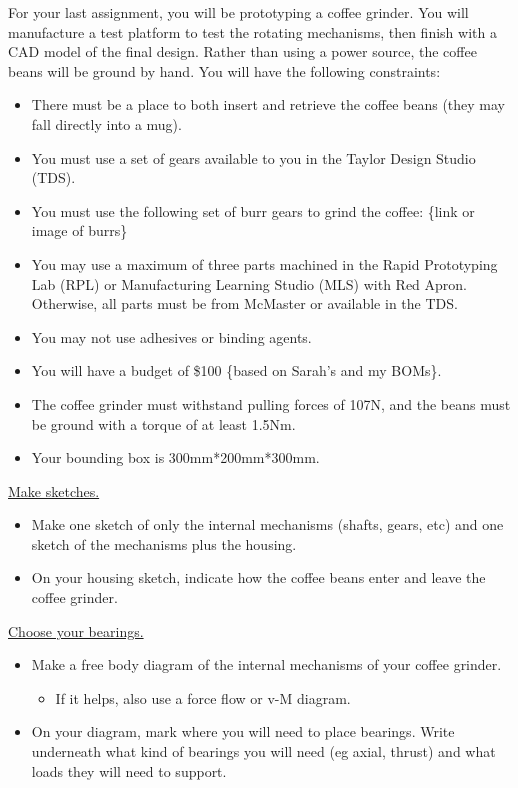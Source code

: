 \documentclass[11pt,letterpaper]{article}
\begin{document}
\MakeHandoutHeader

For your last assignment, you will be prototyping a coffee grinder. You will manufacture a
test platform to test the rotating mechanisms, then finish with a CAD model of the final design.
Rather than using a power source, the coffee beans will be ground by hand. You will have the
following constraints:
\begin{itemize}
  \item There must be a place to both insert and retrieve the coffee beans (they may fall directly into
    a mug).
  \item You must use a set of gears available to you in the Taylor Design Studio (TDS).
  \item You must use the following set of burr gears to grind the coffee: \{link or image of burrs\}
  \item You may use a maximum of three parts machined in the Rapid Prototyping Lab (RPL) or
    Manufacturing Learning Studio (MLS) with Red Apron. Otherwise, all parts must be from
    McMaster or available in the TDS.
  \item You may not use adhesives or binding agents.
  \item You will have a budget of \$100 \{based on Sarah's and my BOMs\}.
  \item The coffee grinder must withstand pulling forces of 107N, and the beans must be ground
    with a torque of at least 1.5Nm.
  \item Your bounding box is 300mm*200mm*300mm.
\end{itemize}

\begin{AssignmentSteps}
  \item \underline{Make sketches.}
    \begin{itemize}
      \item Make one sketch of only the internal mechanisms (shafts, gears, etc) and one sketch of the
        mechanisms plus the housing.
      \item On your housing sketch, indicate how the coffee beans enter and leave the coffee grinder.
    \end{itemize}
  \item \underline{Choose your bearings.}
    \begin{itemize}
      \item Make a free body diagram of the internal mechanisms of your coffee grinder.
        \begin{itemize}
          \item If it helps, also use a force flow or v-M diagram.
        \end{itemize}
      \item On your diagram, mark where you will need to place bearings. Write underneath what kind
        of bearings you will need (eg axial, thrust) and what loads they will need to support.
    \end{itemize}
\end{AssignmentSteps}
\end{document}
